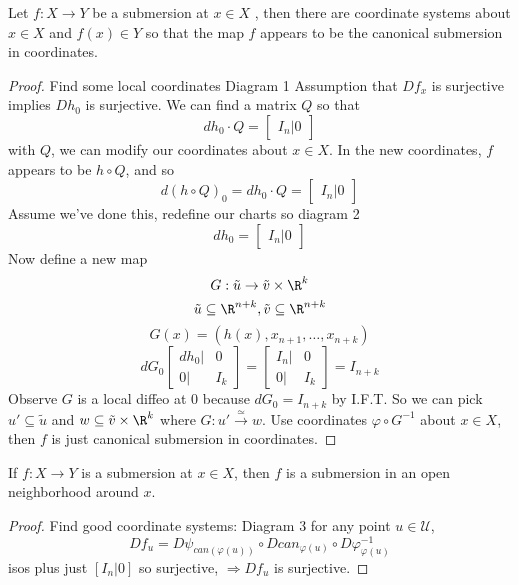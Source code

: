 \begin{proposition}
  Let $f: X \to Y$ be a submersion at $x\in X$ , then there are coordinate systems about $x\in X$ and $f(x)\in Y$ so that the map $f$ appears to be the canonical submersion in coordinates.
\end{proposition}
\begin{proof}
  Find some local coordinates
  \newline Diagram 1
  \newline Assumption that $Df_x$ is surjective implies $Dh_0$ is surjective.
  \newline We can find a matrix $Q$ so that
    $$dh_0 \cdot Q =
    \begin{bmatrix}
      I_n | 0
    \end{bmatrix}$$
    with $Q$, we can modify our coordinates about $x\in X$. %
    In the new coordinates, $f$ appears to be $h\circ Q$, and so
      $$d \left(h\circ Q\right)_0=dh_0 \cdot Q =
      \begin{bmatrix}
        I_n | 0
      \end{bmatrix}$$
    Assume we've done this, redefine our charts so
    \newline diagram 2
      $$dh_0=
      \begin{bmatrix}
        I_n | 0
      \end{bmatrix}$$
      Now define a new map
        $$G:\tilde{u}\to \tilde{v}\times \R^k$$
        $$\tilde{u}\subseteq \R^{n+k}, \tilde{v}\subseteq \R^{n+k}$$
        $$G(x)=\left(h(x),x_{n+1},\dots,x_{n+k}\right)$$
        $$dG_0
        \begin{bmatrix}
            dh_0 | & 0 \\
            0 | & I_k
        \end{bmatrix}=
        \begin{bmatrix}
          I_n | & 0 \\
          0 | & I_k
        \end{bmatrix}=I_{n+k}$$
      Observe $G$ is a local diffeo at $0$ because $dG_0=I_{n+k}$ by I.F.T. So we can pick $u'\subseteq \tilde{u}$ and $w\subseteq \tilde{v}\times \R^k$ where $G:u'\xrightarrow{\simeq}w$. Use coordinates $\varphi \circ G ^{-1}$ about $x\in X$, then $f$ is just canonical submersion in coordinates.
\end{proof}

\begin{proposition}
  If $f: X \to Y$ is a submersion at $x\in X$, then $f$ is a submersion in an open neighborhood around $x$.
\end{proposition}
\begin{proof}
  Find good coordinate systems:
  \newline Diagram 3
  \newline for any point $u\in \mathcal{U}$,
    $$Df_u=D\psi_{can(\varphi (u))}\circ Dcan_{\varphi (u)}\circ D \varphi ^{-1}_{\varphi (u)}$$
    isos plus just $[I_n | 0]$ so surjective, $\Rightarrow Df_u$ is surjective.
\end{proof}

